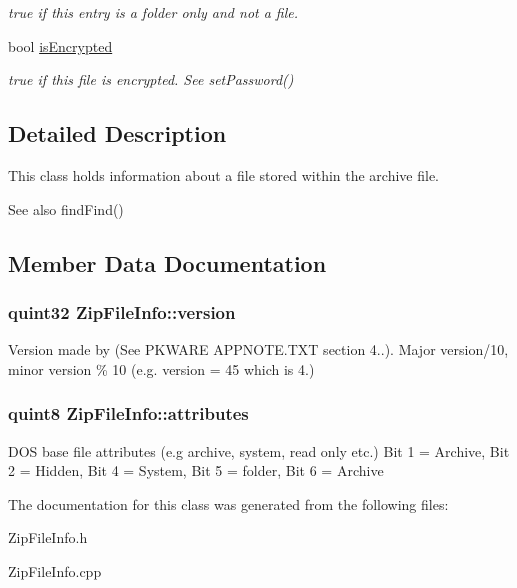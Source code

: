 \begin{DoxyCompactItemize}
\begin{DoxyCompactList}\small\item\em true if this entry is a folder only and not a file. \end{DoxyCompactList}\item 
bool \hyperlink{class_zip_file_info_a7c95573352b13d2a8842584ed8ac6a4f}{is\+Encrypted}\hypertarget{class_zip_file_info_a7c95573352b13d2a8842584ed8ac6a4f}{}\label{class_zip_file_info_a7c95573352b13d2a8842584ed8ac6a4f}

\begin{DoxyCompactList}\small\item\em true if this file is encrypted. See set\+Password() \end{DoxyCompactList}\end{DoxyCompactItemize}


\subsection{Detailed Description}
This class holds information about a file stored within the archive file. 

\begin{DoxySeeAlso}{See also}
find\+Find() 
\end{DoxySeeAlso}


\subsection{Member Data Documentation}
\subsubsection[{\texorpdfstring{version}{version}}]{\setlength{\rightskip}{0pt plus 5cm}quint32 Zip\+File\+Info\+::version}\hypertarget{class_zip_file_info_a3c716f122b4ef2855fda29c85134afc9}{}\label{class_zip_file_info_a3c716f122b4ef2855fda29c85134afc9}
Version made by (See P\+K\+W\+A\+RE A\+P\+P\+N\+O\+T\+E.\+T\+XT section 4..). Major version/10, minor version \% 10 (e.\+g. version = 45 which is 4.) 
\subsubsection[{\texorpdfstring{attributes}{attributes}}]{\setlength{\rightskip}{0pt plus 5cm}quint8 Zip\+File\+Info\+::attributes}\hypertarget{class_zip_file_info_add65b96e7292b4b9cc64df88df825757}{}\label{class_zip_file_info_add65b96e7292b4b9cc64df88df825757}
D\+OS base file attributes (e.\+g archive, system, read only etc.) Bit 1 = Archive, Bit 2 = Hidden, Bit 4 = System, Bit 5 = folder, Bit 6 = Archive 

The documentation for this class was generated from the following files\+:\begin{DoxyCompactItemize}
\item 
Zip\+File\+Info.\+h\item 
Zip\+File\+Info.\+cpp\end{DoxyCompactItemize}
